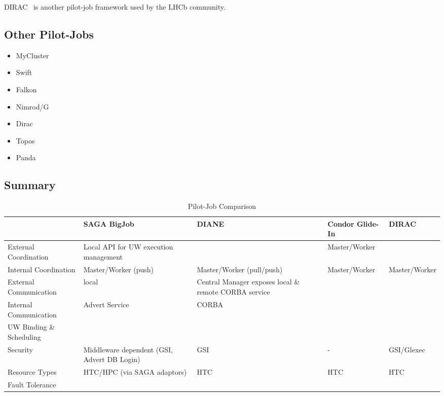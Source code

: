 \documentclass[]{article}
\begin{document}
DIRAC~\cite{1742-6596-219-6-062049} is another pilot-job framework used by the 
LHCb community.

\subsection{Other Pilot-Jobs}

\begin{itemize}
    \item MyCluster
    \item Swift
    \item Falkon
    \item Nimrod/G
    \item Dirac
    \item Topos
    \item Panda    
\end{itemize}


\subsection{Summary}

\begin{table}[ht]
\centering
\begin{tabular}{|l|p{2.5cm}|p{2.5cm}|p{2.5cm}|p{2.5cm}|}
	\hline
	&\textbf{SAGA BigJob} &\textbf{DIANE} &\textbf{Condor Glide-In} &   
	\textbf{DIRAC} \\ \hline
External Coordination &Local API for UW execution management & &Master/Worker &\\ \hline

Internal Coordination &Master/Worker (push) &Master/Worker (pull/push) &Master/Worker &Master/Worker\\ \hline

External Communication &local &Central Manager exposes local \& remote CORBA service & &\\ \hline
	
Internal Communication &Advert Service &CORBA & & \\ \hline

UW Binding \& Scheduling &&&&\\ \hline

Security &Middleware dependent (GSI, Advert DB Login) &GSI &- &GSI/Glexec\\ \hline

Resource Types &HTC/HPC (via SAGA adaptors) &HTC &HTC &HTC \\ \hline

Fault Tolerance  &&&&\\ \hline
	
\end{tabular}
\caption{Pilot-Job Comparison}
\end{table}
\end{document}
